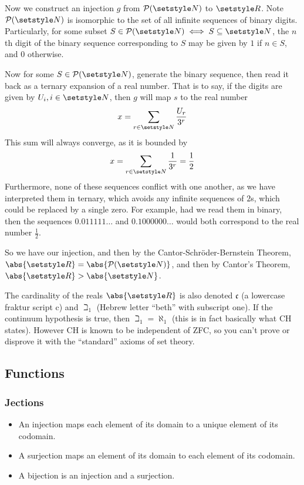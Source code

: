 Now we construct an injection \(g\) from \(\PowerSet(\Naturals)\) to \(\Reals\).
Note \(\PowerSet(\Naturals)\) is isomorphic to the set of all infinite sequences
of binary digits. Particularly, for some subset
\(S \in \PowerSet(\Naturals) \iff S \subseteq \Naturals\), the \(n\)th digit of
the binary sequence corresponding to \(S\) may be given by \(1\) if \(n \in S\),
and \(0\) otherwise.

Now for some \(S \in \PowerSet(\Naturals)\), generate the binary sequence, then
read it back as a ternary expansion of a real number. That is to say, if the
digits are given by \(U_i, i \in \Naturals\), then \(g\) will map \(s\) to the
real number
\begin{equation*}
 x = \sum_{r \in \Naturals} \frac{U_r}{3^r}
\end{equation*}
This sum will always converge, as it is bounded by
\begin{equation*}
 x = \sum_{r \in \Naturals} \frac 1{3^r} = \frac 12
\end{equation*}
Furthermore, none of these sequences conflict with one another, as we have
interpreted them in ternary, which avoids any infinite sequences of \(2\)s,
which could be replaced by a single zero. For example, had we read them in
binary, then the sequences \(0.011111\ldots\) and \(0.1000000\ldots\) would both
correspond to the real number \(\frac 12\).

So we have our injection, and then by the Cantor-Schr\"oder-Bernstein Theorem,
\(\abs{\Reals} = \abs{\PowerSet(\Naturals)}\), and then by Cantor's Theorem,
\(\abs{\Reals} > \abs{\Naturals}\).

The cardinality of the reals \(\abs{\Reals}\) is also denoted \(\mathfrak c\) (a
lowercase fraktur script c) and \(\beth_1\) (Hebrew letter ``beth'' with
subscript one). If the continuum hypothesis is true, then \(\beth_1 = \aleph_1\)
(this is in fact basically what CH states). However CH is known to be
independent of ZFC, so you can't prove or disprove it with the ``standard''
axioms of set theory.


\subsection{Functions}


\subsubsection{Jections}


\begin{itemize}
 \item An injection maps each element of its domain to a unique element of
       its codomain.
 \item A surjection maps an element of its domain to each element of its
       codomain.
 \item A bijection is an injection and a surjection.
\end{itemize}
